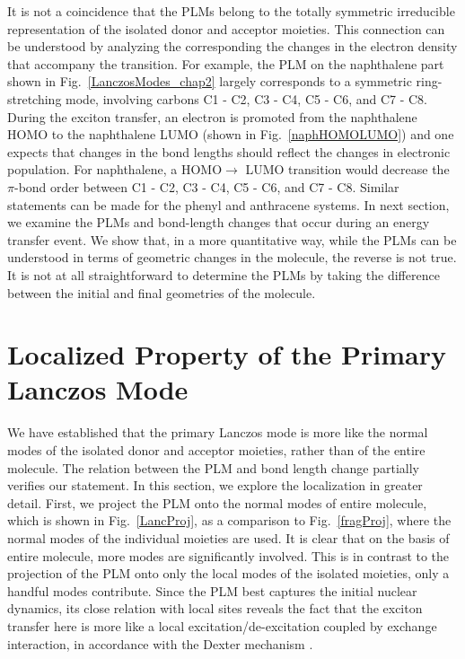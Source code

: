 It is not a coincidence that the PLMs belong to the totally symmetric irreducible representation of the isolated donor and acceptor moieties.
This connection can be understood by analyzing the corresponding  the changes in the electron density that accompany the transition.
For example, the PLM on the naphthalene part shown in  Fig.~\ref{LanczosModes_chap2}
largely corresponds to a symmetric ring-stretching mode,  involving carbons
C1 - C2, C3 - C4, C5 - C6, and C7 - C8.
During the exciton transfer, an electron is promoted from the naphthalene HOMO to the naphthalene LUMO (shown in Fig.~\ref{naphHOMOLUMO})
and one expects that changes in the bond lengths should reflect the changes in
electronic population.
For naphthalene, a HOMO$\to$ LUMO transition would
decrease the $\pi$-bond order between C1 - C2, C3 - C4, C5 - C6, and C7 - C8.
Similar statements can be made for the phenyl and anthracene systems.
In next section,  we examine the PLMs and bond-length changes that occur during an energy  transfer event.
We show that, in a more quantitative way,   while the  PLMs can be understood in terms of
geometric changes in the molecule,  the reverse is not true.
It is not at all straightforward to determine the PLMs by taking the difference between the initial
and final geometries of the molecule.


\section{Localized Property of the Primary Lanczos Mode}

We have established  that the primary Lanczos mode is more like the normal modes of the isolated
donor and acceptor moieties, rather than of the entire molecule. The relation between the
PLM and bond length change partially verifies our statement.
In this section, we explore  the localization in greater detail.
First, we project the PLM onto the normal modes of entire molecule,
which is shown in Fig.~\ref{LancProj}, as a comparison to Fig.~\ref{fragProj}, where the normal modes of the individual moieties are used.    It is clear that on the basis of entire molecule, more modes are significantly involved.   This is in contrast to the projection of the PLM onto only the local modes of the isolated moieties, only a handful modes contribute.  Since the PLM  best captures the initial nuclear dynamics,
 its close relation with local sites reveals the fact that the exciton transfer here is more like a local excitation/de-excitation
coupled by exchange interaction,  in accordance with the Dexter mechanism \cite{dexter1953theory}.

